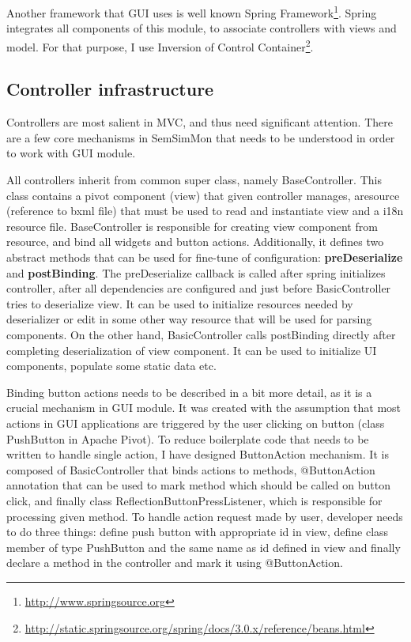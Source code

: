 Another framework that GUI uses is well known Spring Framework\footnote{\url{http://www.springsource.org}}. Spring integrates all components of this module, to associate controllers with views and model. For that purpose, I use Inversion of Control Container\footnote{\url{http://static.springsource.org/spring/docs/3.0.x/reference/beans.html}}. 

\subsection{Controller infrastructure}

Controllers are most salient in MVC, and thus need significant attention. There are a few core mechanisms in SemSimMon that needs to be understood in order to work with GUI module.

All controllers inherit from common super class, namely BaseController. This class contains a pivot component (view) that given controller manages, aresource (reference to bxml file) that must be used to read and instantiate view and a i18n resource file. BaseController is responsible for creating view component from resource, and bind all widgets and button actions. Additionally, it defines two abstract methods that can be used for fine-tune of configuration: \textbf{preDeserialize} and \textbf{postBinding}. The preDeserialize callback is called after spring initializes controller, after all dependencies are configured and just before BasicController tries to deserialize view. It can be used to initialize resources needed by deserializer or edit in some other way resource that will be used for parsing components. On the other hand, BasicController calls postBinding directly after completing deserialization of view component. It can be used to initialize UI components, populate some static data etc.

Binding button actions needs to be described in a bit more detail, as it is a crucial mechanism in GUI module. It was created with the assumption that most actions in GUI applications are triggered by the user clicking on button (class PushButton in Apache Pivot). To reduce boilerplate code that needs to be written to handle single action, I have designed ButtonAction mechanism. It is composed of BasicController that binds actions to methods, @ButtonAction annotation that can be used to mark method which should be called on button click, and finally class ReflectionButtonPressListener, which is responsible for processing given method. To handle action request made by user, developer needs to do three things: define push button with appropriate id in view, define class member of type PushButton and the same name as id defined in view and finally declare a method in the controller and mark it using @ButtonAction.

